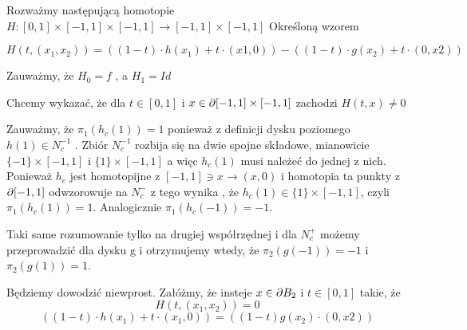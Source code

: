   Rozważmy następującą homotopie $ H : [0,1] \times [-1,1] \times[-1,1] \to [-1,1] \times [-1,1] $
  Określoną wzorem
  
  \begin{equation}
    H(t,(x_1,x_2) ) = ((1-t) \cdot h(x_1) +t \cdot (x1,0)) - ( (1-t) \cdot g(x_2) +  t \cdot (0,x2))
  \end{equation}
  
  Zauważmy, że $H_0 = f $ , a $ H_1 = Id $ 
  
  Chcemy wykazać, że dla $ t \in [0,1] $ i $ x \in \partial [-1,1] \times [-1,1] $ zachodzi $ H(t,x) \neq 0 $
  
  Zauważmy, że $ \pi_1(h_c(1)) = 1 $ ponieważ z definicji dysku poziomego $ h(1) \in N^{-1}_c $ .
  Zbiór $ N^{-1}_c $ rozbija się na dwie spojne składowe, mianowicie $ \{{-1}\} \times [-1,1] $
  i $ \{1 \} \times [-1,1] $ a więc $ h_c(1) $ musi należeć do jednej z nich. Ponieważ 
  $ h_c $ jest homotopijne z $ [-1,1] \ni x \to (x,0) $ i homotopia ta punkty z  $ \partial [-1,1] $ 
  odwzorowuje na $ N^{-}_c $ z tego wynika , że $ h_c(1) \in \{1\} \times [-1,1] $, czyli $ \pi_1(h_c(1)) = 1 $.
  Analogicznie $ \pi_1(h_c(-1) )= -1 $.
  
  Taki same rozumowanie tylko na drugiej współrzędnej i dla $ N^{+}_c $ możemy przeprowadzić dla 
  dysku g i otrzymujemy wtedy, że $ \pi_2(g(-1)) = -1 $ i $ \pi_2(g(1)) =  1 $.
  
  Będziemy dowodzić niewprost. Załóżmy, że insteje $ x \in \partial B_2 $ i $ t \in [0,1] $ takie, że 
 \begin{equation}
    H(t,(x_1,x_2) ) = 0
  \end{equation}
  \begin{equation}
     ((1-t) \cdot h(x_1) + t \cdot (x_1,0)) = ( (1-t) g(x_2) \cdot (0,x2))
  \end{equation}
  
